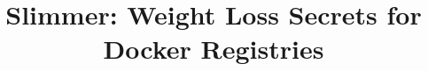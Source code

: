 \documentclass[10pt, conference, compsocconf]{IEEEtran}
\newcommand{\alicomment}[1]{\noindent\textcolor{green}{\bf $\blacksquare$ Ali: #1}}
\newcommand{\ie}{i.e.\ }
\newcommand{\eg}{e.g.,\ }
\newcommand{\etal}{et al.~}
\begin{document}
	
	
	\title{
		Slimmer: Weight Loss Secrets for Docker Registries
	}

%
%
%

%
%
%


%
%
%
%
%

%
%
%
%
%

%
\end{document}
